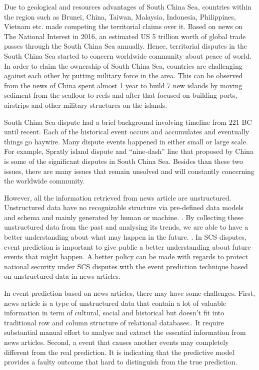 \documentclass[twoside]{utmthesis}
\begin{document}
Due to geological and resources advantages of South China Sea, countries within the region such as Brunei, China, Taiwan, Malaysia, Indonesia, Philippines, Vietnam etc. made competing the territorial claims over it. Based on news on The National Interest in 2016, an estimated US 5 trillion worth of global trade passes through the South China Sea annually. Hence, territorial disputes in the South China Sea started to concern worldwide community about peace of world. In order to claim the ownership of South China Sea, countries are challenging against each other by putting military force in the area. This can be observed from the news of China spent almost 1 year to build 7 new islands by moving sediment from the seafloor to reefs and after that focused on building ports, airstrips and other military structures on the islands. 

South China Sea dispute had a brief background involving timeline from 221 BC until recent. Each of the historical event occurs and accumulates and eventually things go haywire. Many dispute events happened in either small or large scale. For example, Spratly island dispute \citep{gonzales2014spratly} and “nine-dash” line  \citep{liuzhen2014} that proposed by China is some of the significant disputes in South China Sea. Besides than these two issues, there are many issues that remain unsolved and will constantly concerning the worldwide community. 

However, all the information retrieved from news article are unstructured. Unstructured data have no recognizable structure via pre-defined data models and schema and mainly generated by human or machine. \citep{christinetaylor2018}. By collecting these unstructured data from the past and analysing its trends, we are able to have a better understanding about what may happen in the future. \citep{bryanbell2016}. In SCS disputes, event prediction is important to give public a better understanding about future events that might happen. A better policy can be made with regards to protect national security under SCS disputes with the event prediction technique based on unstructured data in news articles. 

In event prediction based on news articles, there may have some challenges. First, news article is a type of unstructured data that contain a lot of valuable information in term of cultural, social and historical \citep{yzaguirre2016newspaper} but doesn't fit into traditional row and column structure of relational databases.\citep{mongoDB2016}. It require substantial manual effort to analyse and extract the essential information from news articles. Second, a event that causes another events may completely different from the real prediction. It is indicating that the predictive model provides a faulty outcome that hard to distinguish from the true prediction. 
\end{document}
